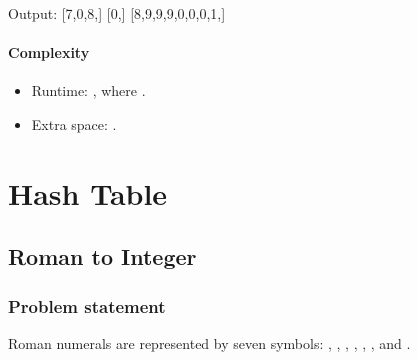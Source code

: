 \documentclass[letterpaper,12pt,english]{book}
\begin{document}
\begin{sphinxVerbatim}[commandchars=\\\{\}]
Output:
[7,0,8,]
[0,]
[8,9,9,9,0,0,0,1,]
\end{sphinxVerbatim}


\subsubsection{Complexity}
\label{\detokenize{Linked_List/02_LL_2_add_two_numbers:complexity}}\begin{itemize}
\item {} 
\sphinxAtStartPar
Runtime: , where .

\item {} 
\sphinxAtStartPar
Extra space: .

\end{itemize}

\sphinxstepscope


\chapter{Hash Table}
\label{\detokenize{Hash_Table/index:hash-table}}\label{\detokenize{Hash_Table/index::doc}}
\sphinxstepscope


\section{Roman to Integer}
\label{\detokenize{Hash_Table/03_H_13_Roman_to_Integer:roman-to-integer}}\label{\detokenize{Hash_Table/03_H_13_Roman_to_Integer::doc}}

\subsection{Problem statement\sphinxfootnotemark[23]}
\label{\detokenize{Hash_Table/03_H_13_Roman_to_Integer:problem-statement}}%
\begin{footnotetext}[23]\sphinxAtStartFootnote
{}
%
\end{footnotetext}\ignorespaces 
\sphinxAtStartPar
Roman numerals are represented by seven symbols: , , , , , , and .
\end{document}
